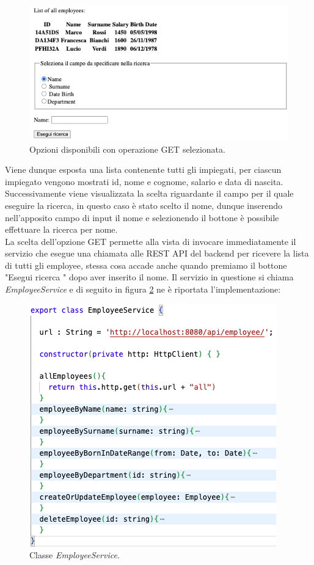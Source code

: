 \FloatBarrier
\begin{figure}[!ht]
\centering
\includegraphics[width=0.7\linewidth]{immagini/getEmployee.png}
\caption{Opzioni disponibili con operazione GET selezionata.}
\label{get-employee}
\end{figure}
\FloatBarrier
Viene dunque esposta una lista contenente tutti gli impiegati, per ciascun impiegato vengono mostrati id, nome e cognome, salario e data di nascita. Successivamente viene visualizzata la scelta riguardante il campo per il quale eseguire la ricerca, in questo caso è stato scelto il nome, dunque inserendo nell'apposito campo di input il nome e selezionendo il bottone è possibile effettuare la ricerca per nome.\\
La scelta dell'opzione GET permette alla vista di invocare immediatamente il servizio che esegue una chiamata alle REST API del backend per ricevere la lista di tutti gli employee, stessa cosa accade anche quando premiamo il bottone "Esegui ricerca " dopo aver inserito il nome. Il servizio in questione si chiama \textit{EmployeeService} e di seguito in figura \ref{employee-service} ne è riportata l'implementazione:
\FloatBarrier
\begin{figure}[!ht]
\centering
\includegraphics[width=0.6\linewidth]{immagini/employeeService.png}
\caption{Classe \textit{EmployeeService}.}
\label{employee-service}
\end{figure}
